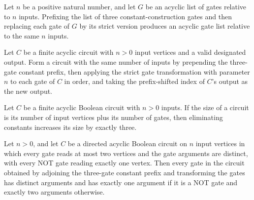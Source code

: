 \begin{theorem}
\label{BoolCircuit.deconst_acyclic}
\leanok
{}
Let $n$ be a positive natural number, and let $G$ be an acyclic list of gates relative
to $n$ inputs. Prefixing the list of three constant-construction gates and then
replacing each gate of $G$ by its strict version produces an acyclic gate list relative
to the same $n$ inputs.
\end{theorem}

\begin{definition}
\label{BoolCircuit.DAGCircuit.deconst}
\leanok
{}
Let $C$ be a finite acyclic circuit with $n>0$ input vertices and a valid designated
output. Form a circuit with the same number of inputs by prepending the three-gate
constant prefix, then applying the strict gate transformation with parameter $n$ to each
gate of $C$ in order, and taking the prefix-shifted index of $C$’s output as the new
output.
\end{definition}

\begin{theorem}
\label{BoolCircuit.DAGCircuit.deconst_size}
\leanok
{}
Let $C$ be a finite acyclic Boolean circuit with $n>0$ inputs. If the size of a circuit
is its number of input vertices plus its number of gates, then eliminating constants
increases its size by exactly three.
\end{theorem}

\begin{theorem}
\label{BoolCircuit.DAGCircuit.deconst_strict}
\leanok
{}
Let $n>0$, and let $C$ be a directed acyclic Boolean circuit on $n$ input vertices in
which every gate reads at most two vertices and the gate arguments are distinct, with
every NOT gate reading exactly one vertex. Then every gate in the circuit obtained by
adjoining the three-gate constant prefix and transforming the gates has distinct
arguments and has exactly one argument if it is a NOT gate and exactly two arguments
otherwise.
\end{theorem}

